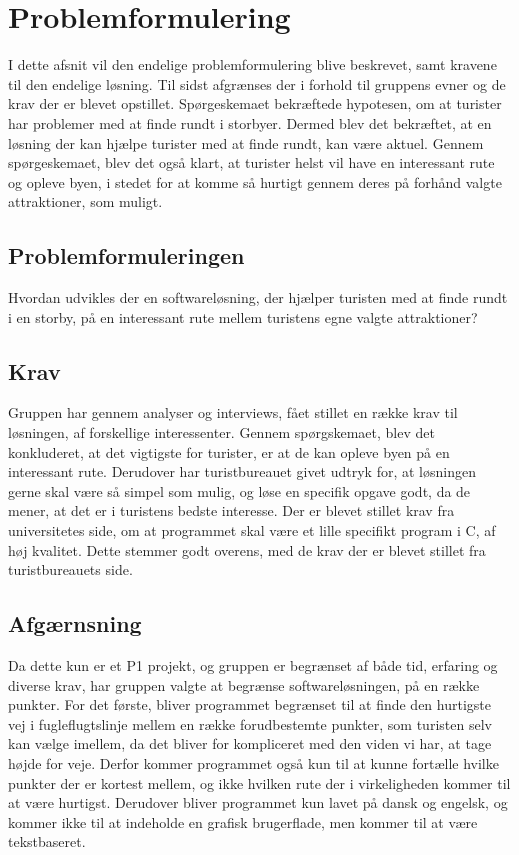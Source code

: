 \chapter{Problemformulering}

I dette afsnit vil den endelige problemformulering blive beskrevet, samt kravene til den endelige løsning. Til sidst afgrænses der i forhold til gruppens evner og de krav der er blevet opstillet. 
Spørgeskemaet bekræftede hypotesen, om at turister har problemer med at finde rundt i storbyer. Dermed blev det bekræftet, at en løsning der kan hjælpe turister med at finde rundt, kan være aktuel. Gennem spørgeskemaet, blev det også klart, at turister helst vil have en interessant rute og opleve byen, i stedet for at komme så hurtigt gennem deres på forhånd valgte attraktioner, som muligt. 


\section{Problemformuleringen}
Hvordan udvikles der en softwareløsning, der hjælper turisten med at finde rundt i en storby, på en interessant rute mellem turistens egne valgte attraktioner?

\section{Krav}
Gruppen har gennem analyser og interviews, fået stillet en række krav til løsningen, af forskellige interessenter. 
Gennem spørgskemaet, blev det konkluderet, at det vigtigste for turister, er at de kan opleve byen på en interessant rute. Derudover har turistbureauet givet udtryk for, at løsningen gerne skal være så simpel som mulig, og løse en specifik opgave godt, da de mener, at det er i turistens bedste interesse. \newline
Der er blevet stillet krav fra universitetes side, om at programmet skal være et lille specifikt program i C, af høj kvalitet. Dette stemmer godt overens, med de krav der er blevet stillet fra turistbureauets side.  

\section{Afgærnsning}
Da dette kun er et P1 projekt, og gruppen er begrænset af både tid, erfaring og diverse krav, har gruppen valgte at begrænse softwareløsningen, på en række punkter. \newline
For det første, bliver programmet begrænset til at finde den hurtigste vej i fugleflugtslinje mellem en række forudbestemte punkter, som turisten selv kan vælge imellem, da det bliver for kompliceret med den viden vi har, at tage højde for veje. Derfor kommer programmet også kun til at kunne fortælle hvilke punkter der er kortest mellem, og ikke hvilken rute der i virkeligheden kommer til at være hurtigst. \newline
Derudover bliver programmet kun lavet på dansk og engelsk, og kommer ikke til at indeholde en grafisk brugerflade, men kommer til at være tekstbaseret.

